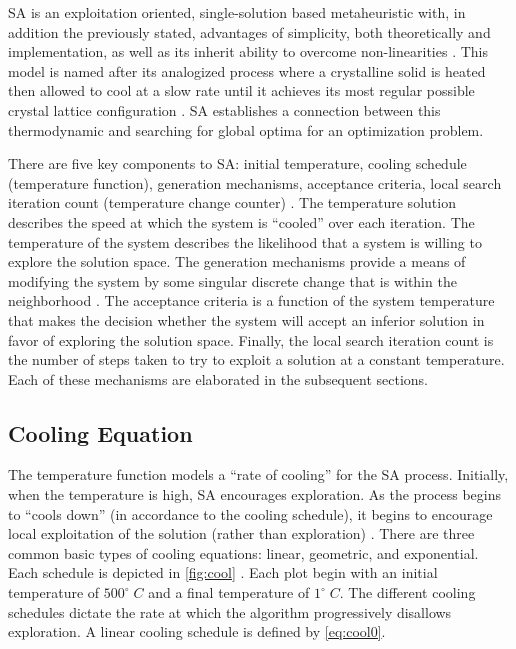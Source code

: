 \documentclass[11pt,a4paper,final]{article}
\begin{document}
SA is an exploitation oriented, single-solution based metaheuristic with, in addition the previously stated, advantages
of simplicity, both theoretically and implementation, as well as its inherit ability to overcome non-linearities
\cite{gendreau-2018-handb-metah,radosavljevic-2018-metah-optim}. This model is named after its analogized process
where a crystalline solid is heated then allowed to cool at a slow rate until it achieves its most regular possible
crystal lattice configuration \cite{henderson-1989-theor-pract}. SA establishes a connection between this thermodynamic
and searching for global optima for an optimization problem.

There are five key components to SA: initial temperature, cooling schedule (temperature function), generation
mechanisms, acceptance criteria, local search iteration count (temperature change counter)
\cite{keller-2019-multi-objec}. The temperature solution describes the speed at which the system is ``cooled'' over each
iteration. The temperature of the system describes the likelihood that a system is willing to explore the solution
space. The generation mechanisms provide a means of modifying the system by some singular discrete change that is within
the neighborhood \cite{gendreau-2018-handb-metah}. The acceptance criteria is a function of the system temperature that
makes the decision whether the system will accept an inferior solution in favor of exploring the solution space.
Finally, the local search iteration count is the number of steps taken to try to exploit a solution at a constant
temperature. Each of these mechanisms are elaborated in the subsequent sections.

\subsection{Cooling Equation}
\label{cooling-equation-experimental}
The temperature function models a ``rate of cooling'' for the SA process. Initially, when the temperature is high, SA
encourages exploration. As the process begins to ``cools down'' (in accordance to the cooling schedule), it begins to
encourage local exploitation of the solution (rather than exploration)
\cite{rutenbar-1989-simul-anneal-algor,henderson-1989-theor-pract}. There are three common basic types of cooling
equations: linear, geometric, and exponential. Each schedule is depicted in \ref{fig:cool} \cite{keller-2019-multi-objec}.
Each plot begin with an initial temperature of \(500^\circ\; C\) and a final temperature of \(1^\circ\; C\). The different cooling
schedules dictate the rate at which the algorithm progressively disallows exploration. A linear cooling schedule is
defined by \ref{eq:cool0}.
\end{document}
